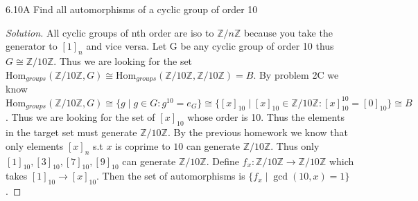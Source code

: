 \documentclass{article}
\newcommand{\Z}{\mathbb{Z}}
\newcommand{\Hom}[0]{\text{Hom}}
\newenvironment{solution}
{\renewcommand\qedsymbol{$\blacksquare$}\begin{proof}[Solution]}
{\end{proof}}
\begin{document}
\begin{PROB}{6.10A}\label{Problem 6.10A.}
    Find all automorphisms of a cyclic group of order 10
\end{PROB}
\begin{solution}
    All cyclic groups of nth order are iso to $\Z/n\Z$ because you take the generator to $[1]_n$ and vice versa. Let G be any cyclic group of order 10 thus $G \cong \Z/10\Z$. Thus we are looking for the set $\Hom_{groups}(\Z/10\Z,G) \cong \Hom_{groups}(\Z/10\Z,\Z/10\Z) = B$. By problem 2C we know $\Hom_{groups}(\Z/10\Z,G) \cong \{g \mid g \in G : g^10 = e_G\} \cong \{[x]_{10} \mid [x]_{10} \in \Z/10\Z : [x]_{10}^{10} = [0]_{10}\} \cong B$. Thus we are looking for the set of $[x]_{10}$ whose order is 10. Thus the elements in the target set must generate $\Z/10\Z$. By the previous homework we know that only elements $[x]_n$ s.t $x$ is coprime to $10$ can generate $\Z/10\Z$. Thus only $[1]_{10}, [3]_{10}, [7]_{10}, [9]_{10}$ can generate $\Z/10\Z$. Define $f_x: \Z/10\Z \to \Z/10\Z$ which takes $[1]_{10} \to [x]_{10}$. Then the set of automorphisms is $\{f_x \mid \gcd(10, x) = 1\}$.
\end{solution}
\end{document}
